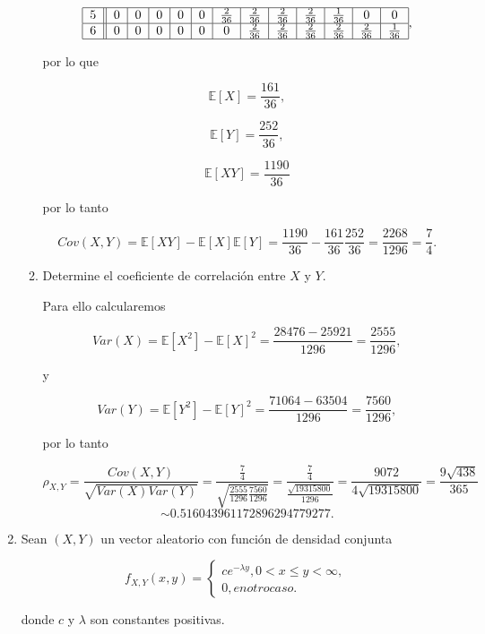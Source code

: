 \documentclass[letterpaper]{article}
\theoremstyle{definition}
\theoremstyle{lemathm}
\theoremstyle{lemathm}
\theoremstyle{lemathm}
\theoremstyle{lemademthm}
\newcommand{\pars}[1]{\left( #1 \right) }
\newcommand{\bracs}[1]{\left[ #1 \right] }
\newcommand{\EE}{\mathbb{E}}
\newcommand{\1}{\mathbbm{1}}
\begin{document}
\begin{enumerate}
\begin{enumerate}
\[\begin{tabular}{|c||c|c|c|c|c|c|c|c|c|c|c|c|}
				\hline

				5 & 0 & 0 & 0 & 0 & 0 & $\frac{2}{36}$ & $\frac{2}{36}$ & $\frac{2}{36}$ & $\frac{2}{36}$ & $\frac{1}{36}$ & 0 & 0\\
				
				\hline

				6 & 0 & 0 & 0 & 0 & 0 & 0 & $\frac{2}{36}$ & $\frac{2}{36}$ & $\frac{2}{36}$ & $\frac{2}{36}$ & $\frac{2}{36}$ & $\frac{1}{36}$\\

				\hline
			\end{tabular},\]

			por lo que

			\[\EE\bracs{X} = \frac{161}{36},\]

			\[\EE\bracs{Y} = \frac{252}{36},\]

			\[\EE\bracs{XY} = \frac{1190}{36}\]

			por lo tanto

			\[Cov\pars{X,Y} = \EE\bracs{XY} - \EE\bracs{X}\EE\bracs{Y} = \frac{1190}{36} - \frac{161}{36}\frac{252}{36} = \frac{2268}{1296} = \frac{7}{4}.\]

			\item Determine el coeficiente de correlación entre $X$ y $Y$.
			
			Para ello calcularemos

			\[Var\pars{X} = \EE\bracs{X^2} - \EE\bracs{X}^2 = \frac{28476 - 25921}{1296} = \frac{2555}{1296},\]

			y

			\[Var\pars{Y} = \EE\bracs{Y^2} - \EE\bracs{Y}^2 = \frac{71064 - 63504}{1296} = \frac{7560}{1296},\]

			por lo tanto

			\[\rho_{X,Y} = \frac{Cov\pars{X,Y}}{\sqrt{Var\pars{X}Var\pars{Y}}} = \frac{\frac{7}{4}}{\sqrt{\frac{2555}{1296}\frac{7560}{1296}}} = \frac{\frac{7}{4}}{\frac{\sqrt{19315800}}{1296}} = \frac{9072}{4\sqrt{19315800}} = \frac{9\sqrt{438}}{365}\]
			\[\sim 0.516043961172896294779277.\]
		\end{enumerate}
		\item Sean $\pars{X,Y}$ un vector aleatorio con función de densidad conjunta
		
		\[f_{X,Y}\pars{x,y} = \begin{cases}
			ce^{-\lambda y}, 0<x\leq y<\infty,\\
			0, en otro caso.
		\end{cases}\]

		donde $c$ y $\lambda$ son constantes positivas.


\end{enumerate}
\end{document}
